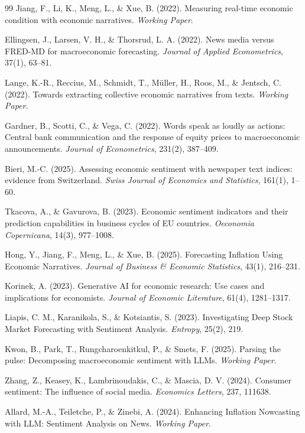 \documentclass[11pt,twocolumn]{article}
\begin{document}
\begin{thebibliography}{99}
 Jiang, F., Li, K., Meng, L., \& Xue, B. (2022). Measuring real-time economic condition with economic narratives. \textit{Working Paper}.

 Ellingsen, J., Larsen, V. H., \& Thorsrud, L. A. (2022). News media versus FRED-MD for macroeconomic forecasting. \textit{Journal of Applied Econometrics}, 37(1), 63--81.

 Lange, K.-R., Reccius, M., Schmidt, T., Müller, H., Roos, M., \& Jentsch, C. (2022). Towards extracting collective economic narratives from texts. \textit{Working Paper}.

 Gardner, B., Scotti, C., \& Vega, C. (2022). Words speak as loudly as actions: Central bank communication and the response of equity prices to macroeconomic announcements. \textit{Journal of Econometrics}, 231(2), 387--409.

 Bieri, M.-C. (2025). Assessing economic sentiment with newspaper text indices: evidence from Switzerland. \textit{Swiss Journal of Economics and Statistics}, 161(1), 1--60.

 Tkacova, A., \& Gavurova, B. (2023). Economic sentiment indicators and their prediction capabilities in business cycles of EU countries. \textit{Oeconomia Copernicana}, 14(3), 977--1008.

 Hong, Y., Jiang, F., Meng, L., \& Xue, B. (2025). Forecasting Inflation Using Economic Narratives. \textit{Journal of Business \& Economic Statistics}, 43(1), 216--231.

 Korinek, A. (2023). Generative AI for economic research: Use cases and implications for economists. \textit{Journal of Economic Literature}, 61(4), 1281--1317.

 Liapis, C. M., Karanikola, S., \& Kotsiantis, S. (2023). Investigating Deep Stock Market Forecasting with Sentiment Analysis. \textit{Entropy}, 25(2), 219.

 Kwon, B., Park, T., Rungcharoenkitkul, P., \& Smets, F. (2025). Parsing the pulse: Decomposing macroeconomic sentiment with LLMs. \textit{Working Paper}.

 Zhang, Z., Keasey, K., Lambrinoudakis, C., \& Mascia, D. V. (2024). Consumer sentiment: The influence of social media. \textit{Economics Letters}, 237, 111638.

 Allard, M.-A., Teiletche, P., \& Zinebi, A. (2024). Enhancing Inflation Nowcasting with LLM: Sentiment Analysis on News. \textit{Working Paper}.


\end{thebibliography}
\end{document}
